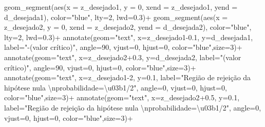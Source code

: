 \documentclass[
]{book}
\newenvironment{Shaded}{\begin{snugshade}}{\end{snugshade}}
\newcommand{\AttributeTok}[1]{\textcolor[rgb]{0.77,0.63,0.00}{#1}}
\newcommand{\DecValTok}[1]{\textcolor[rgb]{0.00,0.00,0.81}{#1}}
\newcommand{\FloatTok}[1]{\textcolor[rgb]{0.00,0.00,0.81}{#1}}
\newcommand{\FunctionTok}[1]{\textcolor[rgb]{0.00,0.00,0.00}{#1}}
\newcommand{\NormalTok}[1]{#1}
\newcommand{\SpecialCharTok}[1]{\textcolor[rgb]{0.00,0.00,0.00}{#1}}
\newcommand{\StringTok}[1]{\textcolor[rgb]{0.31,0.60,0.02}{#1}}
\begin{document}
\begin{Shaded}
\begin{Highlighting}[]
  \FunctionTok{geom\_segment}\NormalTok{(}\FunctionTok{aes}\NormalTok{(}\AttributeTok{x =}\NormalTok{ z\_desejado1, }\AttributeTok{y =} \DecValTok{0}\NormalTok{, }\AttributeTok{xend =}\NormalTok{ z\_desejado1, }\AttributeTok{yend =}\NormalTok{ d\_desejada1), }\AttributeTok{color=}\StringTok{"blue"}\NormalTok{, }\AttributeTok{lty=}\DecValTok{2}\NormalTok{, }\AttributeTok{lwd=}\FloatTok{0.3}\NormalTok{)}\SpecialCharTok{+}
  \FunctionTok{geom\_segment}\NormalTok{(}\FunctionTok{aes}\NormalTok{(}\AttributeTok{x =}\NormalTok{ z\_desejado2, }\AttributeTok{y =} \DecValTok{0}\NormalTok{, }\AttributeTok{xend =}\NormalTok{ z\_desejado2, }\AttributeTok{yend =}\NormalTok{ d\_desejada2), }\AttributeTok{color=}\StringTok{"blue"}\NormalTok{, }\AttributeTok{lty=}\DecValTok{2}\NormalTok{, }\AttributeTok{lwd=}\FloatTok{0.3}\NormalTok{)}\SpecialCharTok{+}
  \FunctionTok{annotate}\NormalTok{(}\AttributeTok{geom=}\StringTok{"text"}\NormalTok{, }\AttributeTok{x=}\NormalTok{z\_desejado1}\FloatTok{{-}0.1}\NormalTok{, }\AttributeTok{y=}\NormalTok{d\_desejada1, }\AttributeTok{label=}\StringTok{"{-}(valor crítico)"}\NormalTok{, }\AttributeTok{angle=}\DecValTok{90}\NormalTok{, }\AttributeTok{vjust=}\DecValTok{0}\NormalTok{, }\AttributeTok{hjust=}\DecValTok{0}\NormalTok{, }\AttributeTok{color=}\StringTok{"blue"}\NormalTok{,}\AttributeTok{size=}\DecValTok{3}\NormalTok{)}\SpecialCharTok{+}
  \FunctionTok{annotate}\NormalTok{(}\AttributeTok{geom=}\StringTok{"text"}\NormalTok{, }\AttributeTok{x=}\NormalTok{z\_desejado2}\FloatTok{+0.3}\NormalTok{, }\AttributeTok{y=}\NormalTok{d\_desejada2, }\AttributeTok{label=}\StringTok{"(valor crítico)"}\NormalTok{, }\AttributeTok{angle=}\DecValTok{90}\NormalTok{, }\AttributeTok{vjust=}\DecValTok{0}\NormalTok{, }\AttributeTok{hjust=}\DecValTok{0}\NormalTok{, }\AttributeTok{color=}\StringTok{"blue"}\NormalTok{,}\AttributeTok{size=}\DecValTok{3}\NormalTok{)}\SpecialCharTok{+}
  \FunctionTok{annotate}\NormalTok{(}\AttributeTok{geom=}\StringTok{"text"}\NormalTok{, }\AttributeTok{x=}\NormalTok{z\_desejado1}\DecValTok{{-}2}\NormalTok{, }\AttributeTok{y=}\FloatTok{0.1}\NormalTok{, }\AttributeTok{label=}\StringTok{"Região de rejeição da hipótese nula }\SpecialCharTok{\textbackslash{}n}\StringTok{probabilidade=\textbackslash{}u03b1/2"}\NormalTok{, }\AttributeTok{angle=}\DecValTok{0}\NormalTok{, }\AttributeTok{vjust=}\DecValTok{0}\NormalTok{, }\AttributeTok{hjust=}\DecValTok{0}\NormalTok{, }\AttributeTok{color=}\StringTok{"blue"}\NormalTok{,}\AttributeTok{size=}\DecValTok{3}\NormalTok{)}\SpecialCharTok{+}
  \FunctionTok{annotate}\NormalTok{(}\AttributeTok{geom=}\StringTok{"text"}\NormalTok{, }\AttributeTok{x=}\NormalTok{z\_desejado2}\FloatTok{+0.5}\NormalTok{, }\AttributeTok{y=}\FloatTok{0.1}\NormalTok{, }\AttributeTok{label=}\StringTok{"Região de rejeição da hipótese nula }\SpecialCharTok{\textbackslash{}n}\StringTok{probabilidade=\textbackslash{}u03b1/2"}\NormalTok{, }\AttributeTok{angle=}\DecValTok{0}\NormalTok{, }\AttributeTok{vjust=}\DecValTok{0}\NormalTok{, }\AttributeTok{hjust=}\DecValTok{0}\NormalTok{, }\AttributeTok{color=}\StringTok{"blue"}\NormalTok{,}\AttributeTok{size=}\DecValTok{3}\NormalTok{)}\SpecialCharTok{+}

\end{Highlighting}
\end{Shaded}
\end{document}
